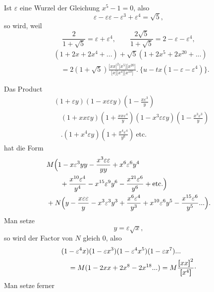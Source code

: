 \begingroup
\newcommand{\TransBracket}[1]{\boldsymbol{[}#1\boldsymbol{]}}
\noindent [S. 49]
\par\indent Ist $\varepsilon$ eine Wurzel der Gleichung $x^5-1=0$, also
\[
\varepsilon-\varepsilon\varepsilon-\varepsilon^3+\varepsilon^4=\surd5,
\]
\noindent so wird, weil
\[
\frac2{1+\surd5}=\varepsilon+\varepsilon^4,\qquad
\frac{2\surd5}{1+\surd5}=2-\varepsilon-\varepsilon^4,
\]
\[\begin{aligned}
&(1+2x+2x^4+{.}{.}{.})+\surd5(1+2x^5+2x^{20}+{.}{.}{.})\\
&\quad=2(1+\surd5)\frac{\TransBracket{xx}^2\TransBracket{x^5}\TransBracket{x^{20}}}{\TransBracket{x}\TransBracket{x^4}\TransBracket{x^{10}}}.\ \{u-tx(1-\varepsilon-\varepsilon^4)\}.
\end{aligned}\]
\par\indent Das Product
\[\begin{aligned}
&(1+\varepsilon y)(1-x\varepsilon\varepsilon y)\left(1-\frac{x\varepsilon^3}y\right)\\
&\quad(1+xx\varepsilon y)\left(1+\frac{xx\varepsilon^4}y\right)(1-x^3\varepsilon\varepsilon y)\left(1-\frac{x^3\varepsilon^3}y\right)\\
&\quad.(1+x^4\varepsilon y)\left(1+\frac{x^4\varepsilon^4}{y^6}\right)\ \text{etc.}
\end{aligned}\]
\clearpage
{}
\noindent hat die Form
\[\begin{aligned}
&M\Bigl(1-x\varepsilon^3yy-\frac{x^3\varepsilon\varepsilon}{yy}+x^6\varepsilon^6y^4\\
&\qquad+\frac{x^{10}\varepsilon^4}{y^4}-x^{15}\varepsilon^9y^6-\frac{x^{21}\varepsilon^6}{y^6}+\text{etc.}\Bigr)\\
&+N\Bigl(y-\frac{x\varepsilon\varepsilon}y-x^3\varepsilon^3y^3+\frac{x^6\varepsilon^4}{y^3}+x^{10}\varepsilon^6y^5-\frac{x^{15}\varepsilon^6}{y^5}{.}{.}{.}\Bigr).
\end{aligned}\]
\noindent Man setze
\[y=\varepsilon\surd x,\]
\noindent so wird der Factor von $N$ gleich $0$, also
\[\begin{aligned}
&(1-\varepsilon^4x)(1-\varepsilon x^3)(1-\varepsilon^4x^5)(1-\varepsilon x^7){.}{.}{.}\\
&\quad=M(1-2xx+2x^8-2x^{18}{.}{.}{.})=M\frac{\TransBracket{xx}^2}{\TransBracket{x^4}}\mathpunct{\raisebox{.5ex}{.}}
\end{aligned}\]
\noindent Man setze ferner
